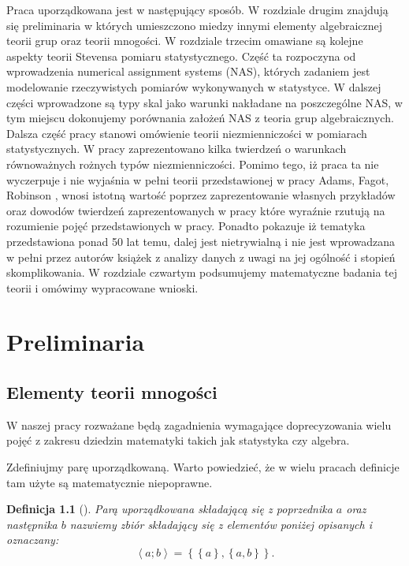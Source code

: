 \documentclass[12pt,a4paper]{report}
\newtheorem{definition}{Definicja}[chapter]
\newcommand{\parauporzadkowana}[2]{\left\langle {#1}; {#2} \right\rangle}
\newcommand{\zbior}[1]{\left\lbrace {#1} \right\rbrace }
\begin{document}
Praca uporządkowana jest w następujący sposób. W rozdziale drugim znajdują się preliminaria w których umieszczono miedzy innymi elementy algebraicznej teorii grup oraz teorii mnogości. W rozdziale trzecim omawiane są kolejne aspekty teorii Stevensa pomiaru statystycznego. Część ta rozpoczyna od wprowadzenia numerical assignment systems (NAS), których zadaniem jest modelowanie rzeczywistych pomiarów wykonywanych w statystyce. W dalszej części wprowadzone są typy skal jako warunki nakładane na poszczególne NAS, w tym miejscu dokonujemy porównania założeń NAS  z teoria grup algebraicznych. Dalsza część pracy stanowi omówienie teorii niezmienniczości w pomiarach statystycznych. W pracy zaprezentowano kilka twierdzeń o warunkach równoważnych rożnych typów niezmienniczości. Pomimo tego, iż praca ta nie wyczerpuje i nie wyjaśnia w pełni teorii przedstawionej w pracy Adams, Fagot, Robinson {\citep{adams1965theory}}, wnosi istotną wartość poprzez zaprezentowanie własnych przykładów oraz dowodów twierdzeń zaprezentowanych w pracy które wyraźnie rzutują na rozumienie pojęć przedstawionych w pracy. Ponadto pokazuje iż tematyka przedstawiona ponad 50 lat temu, dalej jest nietrywialną i nie jest wprowadzana w pełni przez autorów książek z analizy danych z uwagi na jej ogólność i stopień skomplikowania. W rozdziale czwartym podsumujemy  matematyczne badania tej teorii i omówimy wypracowane wnioski.

\chapter{Preliminaria}


\section{Elementy teorii mnogości}
W naszej pracy rozważane będą zagadnienia wymagające doprecyzowania wielu pojęć z zakresu dziedzin matematyki takich jak statystyka czy algebra. 


Zdefiniujmy parę uporządkowaną. Warto powiedzieć, że w wielu pracach definicje tam użyte są matematycznie niepoprawne.

\begin{definition}[{\citep[Sec 3.3]{kuratowski1966wstkep}}]
Parą uporządkowana składającą się z poprzednika $a$ oraz następnika $b$ nazwiemy zbiór składający się z elementów poniżej opisanych i oznaczany:
\begin{equation*}
\parauporzadkowana{a}{b}=\zbior{\zbior{a}, \zbior{a,b}}.
\end{equation*}

\end{definition}
\end{document}
